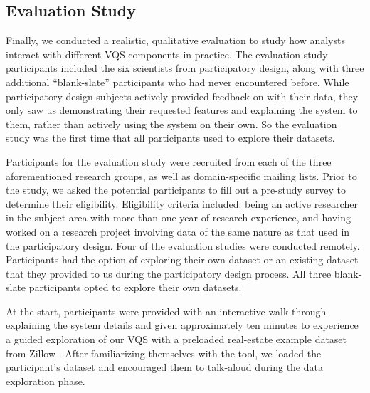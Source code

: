 \subsection{Evaluation Study}
\par Finally, we conducted a realistic, qualitative evaluation to study how analysts interact with different VQS components in practice. The evaluation study participants included the six scientists from participatory design, along with three additional ``blank-slate'' participants who had never encountered \zv before. While participatory design subjects actively provided feedback on \zv with their data, they only saw us demonstrating their requested features and explaining the system to them, rather than actively using the system on their own. So the evaluation study was the first time that all participants used \zv to explore their datasets.
\par Participants for the evaluation study were recruited from each of the three aforementioned research groups, as well as domain-specific mailing lists. Prior to the study, we asked the potential participants to fill out a pre-study survey to determine their eligibility. Eligibility criteria included: being an active researcher in the subject area with more than one year of research experience, and having worked on a research project involving data of the same nature as that used in the participatory design. Four of the evaluation studies were conducted remotely. Participants had the option of exploring their own dataset or an existing dataset that they provided to us during the participatory design process. All three blank-slate participants opted to explore their own datasets. %
\par At the start, participants were provided with an interactive walk-through explaining the system details and given approximately ten minutes to experience a guided exploration of our VQS with a preloaded real-estate example dataset from Zillow \cite{zillow}. After familiarizing themselves with the tool, we loaded the participant's dataset and encouraged them to talk-aloud during the data exploration phase.%
